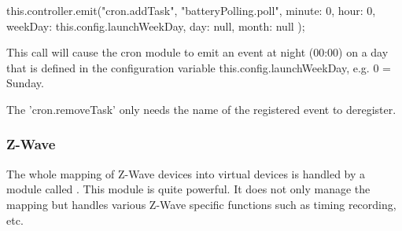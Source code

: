 \begin{listingverbatim}
    this.controller.emit("cron.addTask", "batteryPolling.poll", {
        minute: 0,
        hour: 0,
        weekDay: this.config.launchWeekDay,
        day: null,
        month: null        
    });
\end{listingverbatim}

This call will cause the cron module to emit an event at night (00:00) on a day 
that is defined in the configuration variable this.config.launchWeekDay, e.g. 0 = Sunday.

The 'cron.removeTask' only needs the name of the registered event to deregister.

\subsubsection{Z-Wave}

The whole mapping of Z-Wave devices into virtual devices is handled by a module called 
. This module is quite powerful. It does not only manage the mapping but handles
various Z-Wave specific functions such as timing recording, etc.

